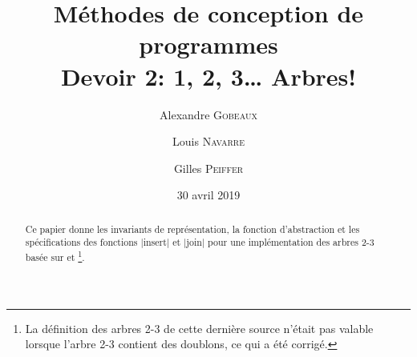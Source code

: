 \documentclass{elsarticle}
\begin{document}
\title{Méthodes de conception de programmes \\ Devoir 2: 1, 2, 3\ldots{} Arbres!}
\date{30 avril 2019}

\address[add1]{École Polytechnique, Université catholique de Louvain, Place de l'Université 1, 1348 Ottignies-Louvain-la-Neuve, Belgique}

\author[add1]{Alexandre \textsc{Gobeaux}}

\author[add1]{Louis \textsc{Navarre}}

\author[add1]{Gilles \textsc{Peiffer}}

\begin{abstract}
Ce papier donne les invariants de représentation, la fonction d'abstraction et les spécifications des fonctions \inlinedafny|insert| et \inlinedafny|join| pour une implémentation des arbres 2-3 basée sur \cite{algs4th} et \cite{wiki:23tree}\footnote{La définition des arbres 2-3 de cette dernière source n'était pas valable lorsque l'arbre 2-3 contient des doublons, ce qui a été corrigé.}.
\end{abstract}
\maketitle
\end{document}
